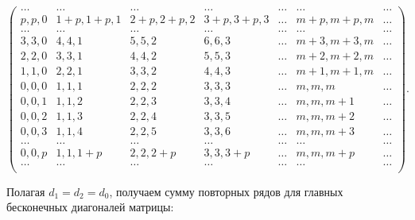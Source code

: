 $$

\begin{pmatrix}

\ldots &\ldots &\ldots &\ldots &\ldots &\ldots &\ldots\\

{p}, {p}, {0}&{1}{+}{p}, {1}{+}{p}, {1}&{2}{+}{p}, {2}{+}{p}, {2}&{3}{+}{p}, {3}{+}{p}, {3}&\ldots &{m}{+}{p}, {m}{+}{p}, {m}&\ldots\\

\ldots &\ldots &\ldots &\ldots &\ldots &\ldots &\ldots\\

{3}, {3}, {0}&{4}, {4}, {1}&{5}, {5}, {2}&{6}, {6}, {3}&\ldots &{m}{+}{3}, {m}{+}{3}, {m}&\ldots\\

{2}, {2}, {0}&{3}, {3}, {1}&{4}, {4}, {2}&{5}, {5}, {3}&\ldots &{m}{+}{2}, {m}{+}{2}, {m}&\ldots\\

{1}, {1}, {0}&{2}, {2}, {1}&{3}, {3}, {2}&{4}, {4}, {3}&\ldots &{m}{+}{1}, {m}{+}{1}, {m}&\ldots\\

{0}, {0}, {0}&{1}, {1}, {1}&{2}, {2}, {2}&{3}, {3}, {3}&\ldots &{m}, {m}, {m}&\ldots\\

{0}, {0}, {1}&{1}, {1}, {2}&{2}, {2}, {3}&{3}, {3}, {4}&\ldots &{m}, {m}, {m}{+}{1}&\ldots\\

{0}, {0}, {2}&{1}, {1}, {3}&{2}, {2}, {4}&{3}, {3}, {5}&\ldots &{m}, {m}, {m}{+}{2}&\ldots\\

{0}, {0}, {3}&{1}, {1}, {4}&{2}, {2}, {5}&{3}, {3}, {6}&\ldots &{m}, {m}, {m}{+}{3}&\ldots\\

\ldots &\ldots &\ldots &\ldots &\ldots &\ldots &\ldots\\

{0}, {0}, {p}&{1}, {1}, {1}{+}{p}&{2}, {2}, {2}{+}{p}&{3}, {3}, {3}{+}{p}&\ldots &{m}, {m}, {m}{+}{p}&\ldots\\

\ldots &\ldots &\ldots &\ldots &\ldots &\ldots &\ldots\\

\end{pmatrix}.

$$



Полагая $d_1=d_2=d_0$, получаем сумму повторных рядов для главных бесконечных диагоналей матрицы:

